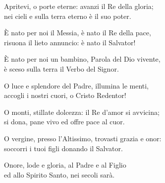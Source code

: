 

\spazio

\strofa Apritevi, o porte eterne: avanzi il Re della gloria;\\
nei cieli e sulla terra eterno è il suo poter.

\spazio


\spazio

\strofa È nato per noi il Messia, è nato il Re della pace,\\
risuona il lieto annuncio: è nato il Salvator!

\spazio


\spazio

\strofa È nato per noi un bambino, Parola del Dio vivente,\\
è sceso sulla terra il Verbo del Signor.

\spazio


\spazio

\strofa O luce e splendore del Padre, illumina le menti,\\
accogli i nostri cuori, o Cristo Redentor!

\spazio


\spazio

\strofa O monti, stillate dolcezza: il Re d'amor si avvicina;\\
si dona, pane vivo ed offre pace al cuor.

\spazio


\spazio

\strofa O vergine, presso l'Altissimo, trovasti grazia e onor:\\
soccorri i tuoi figli donando il Salvator.

\spazio


\spazio

\strofa Onore, lode e gloria, al Padre e al Figlio\\
ed allo Spirito Santo, nei secoli sarà.

\spazio

